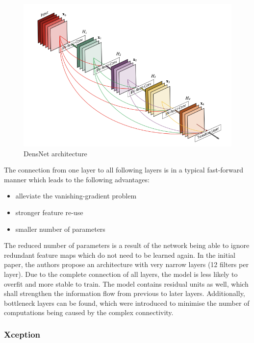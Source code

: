 \begin{figure}[ht]
  \centering
  \includegraphics[width=\linewidth]{figures/densenet.png}
  \caption{DensNet architecture\cite{huang2018densely}}
  \label{densnet}
\end{figure}

The connection from one layer to all following layers is in a typical fast-forward manner which leads to the following advantages:
\begin{itemize}
  \item alleviate the vanishing-gradient problem
  \item stronger feature re-use
  \item smaller number of parameters
\end{itemize}

The reduced number of parameters is a result of the network being able to ignore redundant feature maps which do not need to be learned again. In the initial paper, the authors propose an architecture with very narrow layers (12 filters per layer)\cite{huang2018densely}. Due to the complete connection of all layers, the model is less likely to overfit and more stable to train.
The model contains residual units as well, which shall strengthen the information flow from previous to later layers. Additionally, bottleneck layers can be found, which were introduced to minimise the number of computations being caused by the complex connectivity.

\subsubsection{Xception}\label{chapter_xception}

